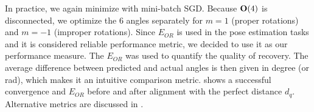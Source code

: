 In practice, we again minimize  with mini-batch SGD.
Because $\mathrm{\mathbf{O}}(4)$ is disconnected, we optimize the 6 angles separately for $m = 1$ (proper rotations) and $m = -1$ (improper rotations). Since $E_{OR}$ is used in the pose estimation tasks and it is considered reliable performance metric, we decided to use it as our performance measure. The $E_{OR}$ was used to quantify the quality of recovery. The average difference between predicted and actual angles is then given in degree (or rad), which makes it an intuitive comparison metric.  shows a successful convergence and $E_{OR}$ before and after alignment with the perfect distance $d_q$. Alternative metrics are discussed in .
